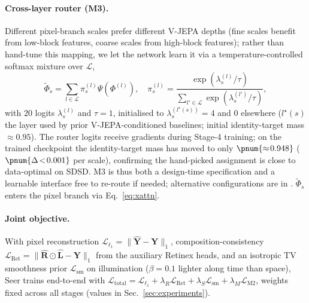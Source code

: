 \paragraph{Cross-layer router (M3).} Different pixel-branch scales prefer different V-JEPA depths (fine scales benefit from low-block features, coarse scales from high-block features); rather than hand-tune this mapping, we let the network learn it via a temperature-controlled softmax mixture over $\mathcal{L}$,
\begin{equation}\label{eq:m3}
\tilde{\Phi}_{s} = \sum_{l\in\mathcal{L}} \pi_{s}^{(l)}\Psi(\Phi^{(l)}),\quad
\pi_{s}^{(l)} = \frac{\exp(\lambda_{s}^{(l)}/\tau)}{\sum_{l'\in\mathcal{L}}\exp(\lambda_{s}^{(l')}/\tau)},
\end{equation}
with $20$ logits $\lambda_{s}^{(l)}$ and $\tau{=}1$, initialised to $\lambda_{s}^{(l^{\star}(s))}{=}4$ and $0$ elsewhere ($l^{\star}(s)$ the layer used by prior V-JEPA-conditioned baselines; initial identity-target mass $\approx\!0.95$). The router logits receive gradients during Stage-4 training; on the trained checkpoint the identity-target mass has moved to only $\pnum{\approx\!0.948}$ ($\pnum{\Delta\!<\!0.001}$ per scale), confirming the hand-picked assignment is close to data-optimal on SDSD. M3 is thus both a design-time specification and a learnable interface free to re-route if needed; alternative configurations are in . $\tilde{\Phi}_{s}$ enters the pixel branch via Eq.~\eqref{eq:xattn}.

\paragraph{Joint objective.} With pixel reconstruction $\mathcal{L}_{\ell_{1}}{=}\|\hat{\mathbf{Y}}{-}\mathbf{Y}\|_{1}$, composition-consistency $\mathcal{L}_{\text{Ret}}{=}\|\hat{\mathbf{R}}\!\odot\!\hat{\mathbf{L}}{-}\mathbf{Y}\|_{1}$ from the auxiliary Retinex heads, and an isotropic TV smoothness prior $\mathcal{L}_{\text{sm}}$ on illumination ($\beta{=}0.1$ lighter along time than space), Seer trains end-to-end with $\mathcal{L}_{\text{total}} = \mathcal{L}_{\ell_{1}} + \lambda_{R}\mathcal{L}_{\text{Ret}} + \lambda_{S}\mathcal{L}_{\text{sm}} + \lambda_{M}\mathcal{L}_{\text{M2}}$, weights fixed across all stages (values in Sec.~\ref{sec:experiments}).

